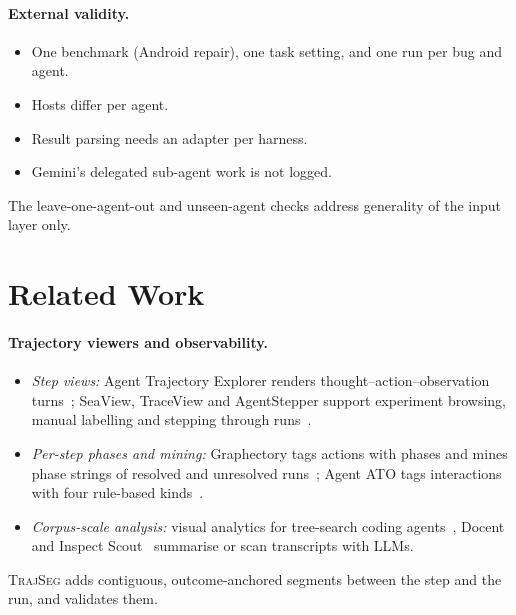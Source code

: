 \documentclass[sigconf,nonacm,10pt]{acmart}
\newcommand{\tool}{\textsc{TrajSeg}}   %
\begin{document}
\paragraph{External validity.}
\begin{itemize}
  \item One benchmark (Android repair), one task setting, and one run per bug and agent.
  \item Hosts differ per agent.
  \item Result parsing needs an adapter per harness.
  \item Gemini's delegated sub-agent work is not logged.
\end{itemize}
The leave-one-agent-out and unseen-agent checks address generality of the input layer
only.

\section{Related Work}
\label{sec:related}

\paragraph{Trajectory viewers and observability.}
\begin{itemize}
  \item \emph{Step views:} Agent Trajectory Explorer renders thought--action--observation
        turns~\cite{desmond2025explorer}; SeaView, TraceView and AgentStepper support
        experiment browsing, manual labelling and stepping through
        runs~\cite{seaview2025,traceview2026,agentstepper2026}.
  \item \emph{Per-step phases and mining:} Graphectory tags actions with phases and
        mines phase strings of resolved and unresolved runs~\cite{graphectory2026};
        Agent ATO tags interactions with four rule-based
        kinds~\cite{agentato2026}.
  \item \emph{Corpus-scale analysis:} visual analytics for tree-search coding
        agents~\cite{wang2025illuminating}, Docent~\cite{docent2025} and Inspect
        Scout~\cite{inspectscout} summarise or scan transcripts with LLMs.
\end{itemize}
\tool{} adds contiguous, outcome-anchored segments between the step and the run, and
validates them.
\end{document}
